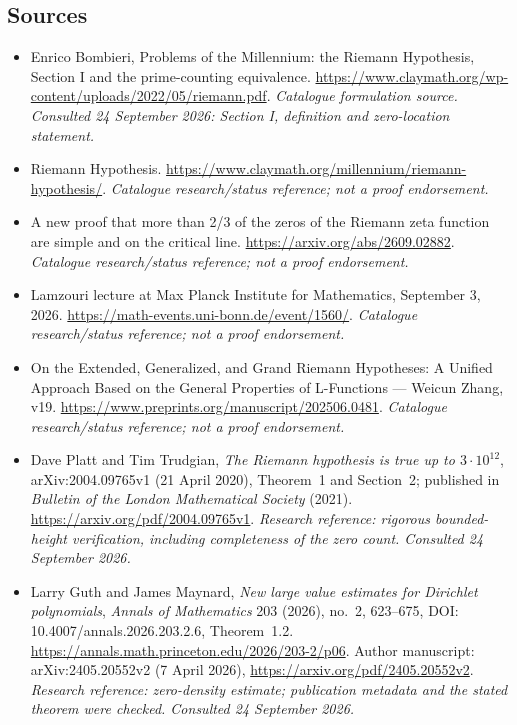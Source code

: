 \documentclass[11pt]{article}
\begin{document}
\subsection{Sources}
\begin{itemize}\raggedright
\item[\textnormal{[S1]}]\hypertarget{source:statement:1}{} Enrico Bombieri, Problems of the Millennium: the Riemann Hypothesis, Section I and the prime-counting equivalence.
\url{https://www.claymath.org/wp-content/uploads/2022/05/riemann.pdf}.
{\small\textit{Catalogue formulation source. Consulted 24 September 2026: Section I, definition and zero-location statement.}}
\item[\textnormal{[S2]}]\hypertarget{source:statement:2}{} Riemann Hypothesis.
\url{https://www.claymath.org/millennium/riemann-hypothesis/}.
{\small\textit{Catalogue research/status reference; not a proof endorsement.}}
\item[\textnormal{[S3]}]\hypertarget{source:statement:3}{} A new proof that more than 2/3 of the zeros of the Riemann zeta function are simple and on the critical line.
\url{https://arxiv.org/abs/2609.02882}.
{\small\textit{Catalogue research/status reference; not a proof endorsement.}}
\item[\textnormal{[S4]}]\hypertarget{source:statement:4}{} Lamzouri lecture at Max Planck Institute for Mathematics, September 3, 2026.
\url{https://math-events.uni-bonn.de/event/1560/}.
{\small\textit{Catalogue research/status reference; not a proof endorsement.}}
\item[\textnormal{[S5]}]\hypertarget{source:statement:5}{} On the Extended, Generalized, and Grand Riemann Hypotheses: A Unified Approach Based on the General Properties of L-Functions — Weicun Zhang, v19.
\url{https://www.preprints.org/manuscript/202506.0481}.
{\small\textit{Catalogue research/status reference; not a proof endorsement.}}

\item[\textnormal{[E1]}]\hypertarget{extra:statement:1}{} Dave Platt and Tim Trudgian,
\emph{The Riemann hypothesis is true up to $3\cdot10^{12}$},
arXiv:2004.09765v1 (21 April 2020), Theorem~1 and Section~2;
published in \emph{Bulletin of the London Mathematical Society} (2021).
\url{https://arxiv.org/pdf/2004.09765v1}.
{\small\textit{Research reference: rigorous bounded-height verification,
including completeness of the zero count. Consulted 24 September 2026.}}

\item[\textnormal{[E2]}]\hypertarget{extra:statement:2}{} Larry Guth and James Maynard,
\emph{New large value estimates for Dirichlet polynomials},
\emph{Annals of Mathematics} 203 (2026), no.~2, 623--675,
DOI: 10.4007/annals.2026.203.2.6, Theorem~1.2.
\url{https://annals.math.princeton.edu/2026/203-2/p06}.
Author manuscript: arXiv:2405.20552v2 (7 April 2026),
\url{https://arxiv.org/pdf/2405.20552v2}.
{\small\textit{Research reference: zero-density estimate; publication metadata
and the stated theorem were checked. Consulted 24 September 2026.}}


\end{itemize}
\end{document}
